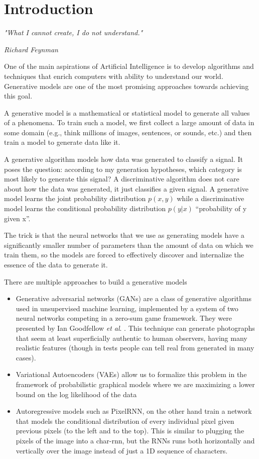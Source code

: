\chapter{Introduction}\label{ch:introduction}

\epigraph{\textit{\Large "What I cannot create, I do not understand."}}{\textit{ \Large Richard Feynman}}
One of the main aspirations of Artificial Intelligence is to develop algorithms and techniques that enrich computers with ability to understand our world. Generative models are one of the most promising approaches towards achieving this goal.\par\bigskip
A generative model is a mathematical or statistical model to generate all values of a phenomena. To train such a model, we first collect a large amount of data in some domain (e.g., think millions of images, sentences, or sounds, etc.) and then train a model to generate data like it.\par\bigskip
A generative algorithm models how data was generated to classify a signal. It poses the question: according to my generation hypotheses, which category is most likely to generate this signal? A discriminative algorithm does not care about how the data was generated, it just classifies a given signal. A generative model learns the joint probability distribution $p(x,y)$ while a discriminative model learns the conditional probability distribution $p(y|x)$ “probability of y given x”.\par\bigskip
The trick is that the neural networks that we use as generating models have a significantly smaller number of parameters than the amount of data on which we train them, so the models are forced to effectively discover and internalize the essence of the data to generate it.\par\bigskip
There are multiple approaches to build a generative models
\begin{itemize}
  \item Generative adversarial networks (GANs) are a class of generative algorithms used in unsupervised machine learning, implemented by a system of two neural networks competing in a zero-sum game framework. They were presented by Ian Goodfellow \textit{et al}. \cite{gan}. This technique can generate photographs that seem at least superficially authentic to human observers, having many realistic features (though in tests people can tell real from generated in many cases).
  \item Variational Autoencoders (VAEs) allow us to formalize this problem in the framework of probabilistic graphical models where we are maximizing a lower bound on the log likelihood of the data
  \item Autoregressive models such as PixelRNN, on the other hand train a network that models the conditional distribution of every individual pixel given previous pixels (to the left and to the top). This is similar to plugging the pixels of the image into a char-rnn, but the RNNs runs both horizontally and vertically over the image instead of just a 1D sequence of characters.
\end{itemize} \par
